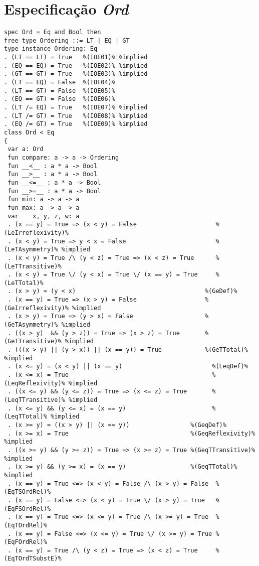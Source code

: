 \section{Especificação \textit{Ord}}
\label{appendix:strictSpec:ord}
\begin{Verbatim}
spec Ord = Eq and Bool then
free type Ordering ::= LT | EQ | GT
type instance Ordering: Eq
. (LT == LT) = True   %(IOE01)% %implied
. (EQ == EQ) = True   %(IOE02)% %implied
. (GT == GT) = True   %(IOE03)% %implied
. (LT == EQ) = False  %(IOE04)%
. (LT == GT) = False  %(IOE05)%
. (EQ == GT) = False  %(IOE06)%
. (LT /= EQ) = True   %(IOE07)% %implied
. (LT /= GT) = True   %(IOE08)% %implied
. (EQ /= GT) = True   %(IOE09)% %implied
class Ord < Eq
{
 var a: Ord
 fun compare: a -> a -> Ordering
 fun __<__ : a * a -> Bool
 fun __>__ : a * a -> Bool
 fun __<=__ : a * a -> Bool
 fun __>=__ : a * a -> Bool
 fun min: a -> a -> a
 fun max: a -> a -> a
 var    x, y, z, w: a
 . (x == y) = True => (x < y) = False                      %(LeIrreflexivity)%
 . (x < y) = True => y < x = False                         %(LeTAsymmetry)% %implied
 . (x < y) = True /\ (y < z) = True => (x < z) = True      %(LeTTransitive)%
 . (x < y) = True \/ (y < x) = True \/ (x == y) = True     %(LeTTotal)%
 . (x > y) = (y < x)                                    %(GeDef)%
 . (x == y) = True => (x > y) = False                   %(GeIrreflexivity)% %implied
 . (x > y) = True => (y > x) = False                    %(GeTAsymmetry)% %implied
 . ((x > y)  && (y > z)) = True => (x > z) = True       %(GeTTransitive)% %implied
 . (((x > y) || (y > x)) || (x == y)) = True            %(GeTTotal)% %implied 
 . (x <= y) = (x < y) || (x == y)                         %(LeqDef)%
 . (x <= x) = True                                        %(LeqReflexivity)% %implied
 . ((x <= y) && (y <= z)) = True => (x <= z) = True       %(LeqTTransitive)% %implied
 . (x <= y) && (y <= x) = (x == y)                        %(LeqTTotal)% %implied
 . (x >= y) = ((x > y) || (x == y))                 %(GeqDef)%
 . (x >= x) = True                                  %(GeqReflexivity)% %implied 
 . ((x >= y) && (y >= z)) = True => (x >= z) = True %(GeqTTransitive)% %implied
 . (x >= y) && (y >= x) = (x == y)                  %(GeqTTotal)% %implied
 . (x == y) = True <=> (x < y) = False /\ (x > y) = False  %(EqTSOrdRel)%
 . (x == y) = False <=> (x < y) = True \/ (x > y) = True   %(EqFSOrdRel)%
 . (x == y) = True <=> (x <= y) = True /\ (x >= y) = True  %(EqTOrdRel)%
 . (x == y) = False <=> (x <= y) = True \/ (x >= y) = True %(EqFOrdRel)%
 . (x == y) = True /\ (y < z) = True => (x < z) = True     %(EqTOrdTSubstE)%

\end{Verbatim}
